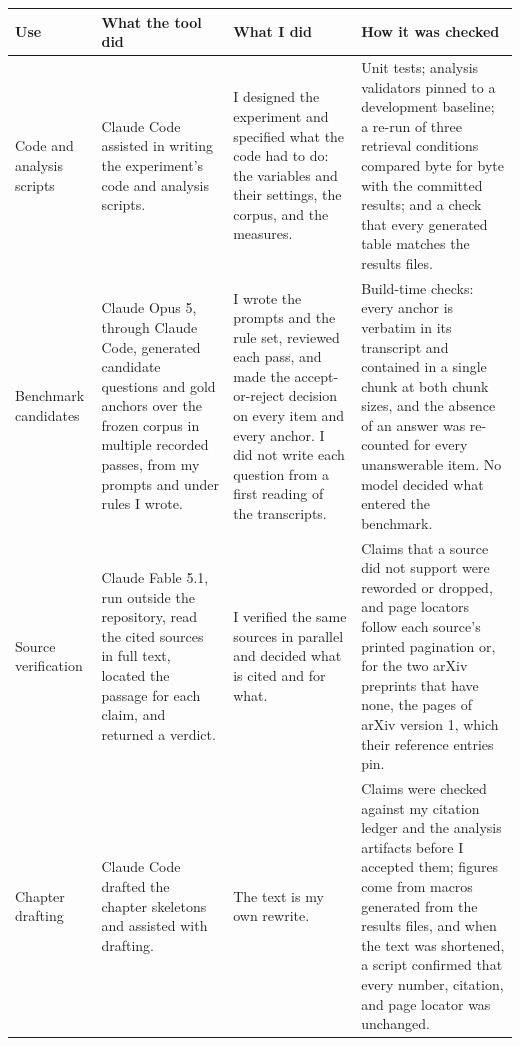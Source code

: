 \begin{singlespace}
\noindent
\begin{minipage}{\textwidth}
\renewcommand{\thetable}{A\arabic{table}}%
\renewcommand{\theHtable}{A\arabic{table}}%
\setcounter{table}{0}%
\label{tab:genai-use}
\small
\begin{tabularx}{\textwidth}{@{}>{\raggedright\arraybackslash}p{}
  >{\raggedright\arraybackslash}X >{\raggedright\arraybackslash}X
  >{\raggedright\arraybackslash}X@{}}
\toprule
Use & What the tool did & What I did & How it was checked \\
\midrule
Code and analysis scripts
& Claude Code assisted in writing the experiment's code and analysis scripts.
& I designed the experiment and specified what the code had to do: the
variables and their settings, the corpus, and the measures.
& Unit tests; analysis validators pinned to a development baseline; a re-run of
three retrieval conditions compared byte for byte with the committed results;
and a check that every generated table matches the results files. \\
Benchmark candidates
& Claude Opus 5, through Claude Code, generated candidate questions and gold
anchors over the frozen corpus in multiple recorded passes, from my prompts and
under rules I wrote.
& I wrote the prompts and the rule set, reviewed each pass, and made the
accept-or-reject decision on every item and every anchor. I did not write each
question from a first reading of the transcripts.
& Build-time checks: every anchor is verbatim in its transcript and contained
in a single chunk at both chunk sizes, and the absence of an answer was
re-counted for every unanswerable item. No model decided what entered the
benchmark. \\
Source verification
& Claude Fable 5.1, run outside the repository, read
the cited sources in full text, located the passage for each claim, and
returned a verdict.
& I verified the same sources in parallel and decided what is cited and for
what.
& Claims that a source did not support were reworded or dropped, and page
locators follow each source's printed pagination or, for the two arXiv preprints
that have none, the pages of arXiv version 1, which their reference entries pin. \\
Chapter drafting
& Claude Code drafted the chapter skeletons and assisted with drafting.
& The text is my own rewrite.
& Claims were checked against my citation ledger and the analysis artifacts
before I accepted them; figures come from macros generated from the results
files, and when the text was shortened, a script confirmed that every number,
citation, and page locator was unchanged. \\
\bottomrule
\end{tabularx}
\end{minipage}
\end{singlespace}
